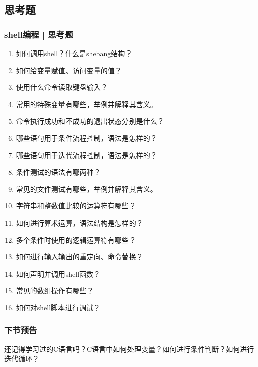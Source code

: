 \subsection{思考题}
\begin{frame}
  \frametitle{shell编程 | 思考题}
  \begin{enumerate}
    \item 如何调用shell？什么是shebang结构？
    \item 如何给变量赋值、访问变量的值？
    \item 使用什么命令读取键盘输入？
    \item 常用的特殊变量有哪些，举例并解释其含义。
    \item 命令执行成功和不成功的退出状态分别是什么？
    \item 哪些语句用于条件流程控制，语法是怎样的？
    \item 哪些语句用于迭代流程控制，语法是怎样的？
    \item 条件测试的语法有哪两种？
    \item 常见的文件测试有哪些，举例并解释其含义。
    \item 字符串和整数值比较的运算符有哪些？
    \item 如何进行算术运算，语法结构是怎样的？
    \item 多个条件时使用的逻辑运算符有哪些？
    \item 如何进行输入输出的重定向、命令替换？
    \item 如何声明并调用shell函数？
    \item 常见的数组操作有哪些？
    \item 如何对shell脚本进行调试？
  \end{enumerate}
\end{frame}


\begin{frame}                                                                          
  \frametitle{下节预告}                                                                
  还记得学习过的C语言吗？C语言中如何处理变量？如何进行条件判断？如何进行迭代循环？                    
\end{frame}  



